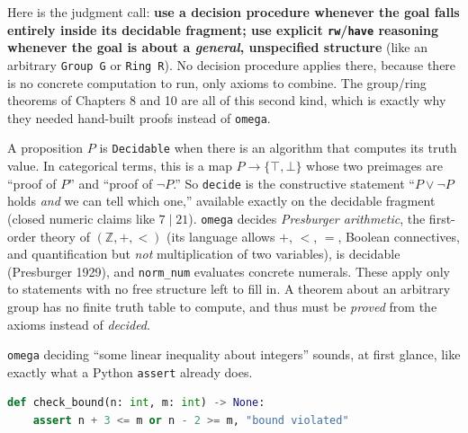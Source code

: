Here is the judgment call: \textbf{use a decision procedure whenever the goal falls entirely inside its decidable fragment; use explicit \texttt{rw}/\texttt{have} reasoning whenever the goal is about a \emph{general}, unspecified structure} (like an arbitrary \texttt{Group G} or \texttt{Ring R}). No decision procedure applies there, because there is no concrete computation to run, only axioms to combine. The group/ring theorems of Chapters 8 and 10 are all of this second kind, which is exactly why they needed hand-built proofs instead of \texttt{omega}.

\begin{mathreading}

A proposition \(P\) is \texttt{Decidable} when there is an algorithm that computes its truth value. In categorical terms, this is a map \(P \to \{\top, \bot\}\) whose two preimages are ``proof of \(P\)'' and ``proof of \(\neg P\).'' So \texttt{decide} is the constructive statement ``\(P \vee
\neg P\) holds \emph{and} we can tell which one,'' available exactly on the decidable fragment (closed numeric claims like \(7 \mid 21\)). \texttt{omega} decides \emph{Presburger arithmetic}, the first-order theory of \((\mathbb{Z},
+, <)\) (its language allows \(+\), \(<\), \(=\), Boolean connectives, and quantification but \emph{not} multiplication of two variables), is decidable (Presburger 1929), and \texttt{norm\_\allowbreak{}num} evaluates concrete numerals. These apply only to statements with no free structure left to fill in. A theorem about an arbitrary group has no finite truth table to compute, and thus must be \emph{proved} from the axioms instead of \emph{decided}.

\end{mathreading}

\begin{progcorner}

\texttt{omega} deciding ``some linear inequality about integers'' sounds, at first glance, like exactly what a Python \texttt{assert} already does.

\end{progcorner}

\begin{lstlisting}[language=Python,style=python]
def check_bound(n: int, m: int) -> None:
    assert n + 3 <= m or n - 2 >= m, "bound violated"
\end{lstlisting}

